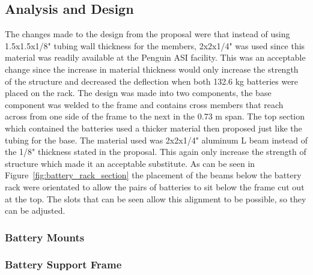 \subsection{Analysis and Design}
The changes made to the design from the proposal were that instead of using 1.5x1.5x1/8" tubing wall thickness for the members, 2x2x1/4" was used since this material was readily available at the Penguin ASI facility. This was an acceptable change since the increase in material thickness would only increase the strength of the structure and decreased the deflection when both 132.6 kg batteries were placed on the rack. The design was made into two components, the base component was welded to the frame and contains cross members that reach across from one side of the frame to the next in the 0.73 m span. The top section which contained the batteries used a thicker material then proposed just like the tubing for the base. The material used was 2x2x1/4" aluminum L beam instead of the 1/8" thickness stated in the proposal. This again only increase the strength of structure which made it an acceptable substitute. As can be seen in Figure~\ref{fig:battery_rack_section} the placement of the beams below the battery rack were orientated to allow the pairs of batteries to sit below the frame cut out at the top. The slots that can be seen allow this alignment to be possible, so they can be adjusted.
\subsubsection{Battery Mounts}
\subsubsection{Battery Support Frame}
